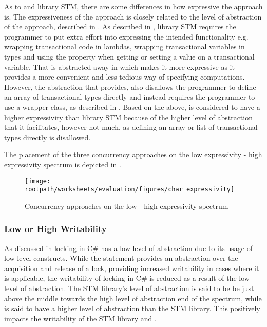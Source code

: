 As to \stmname and library \ac{STM}, there are some differences in how expressive the approach is. The expressiveness of the approach is closely related to the level of abstraction of the approach, described in . As described in , library \ac{STM} requires the programmer to put extra effort into expressing the intended functionality e.g. wrapping transactional code in lambdas, wrapping transactional variables in  types and using the  property when getting or setting a value on a transactional variable. That is abstracted away in \stmname which makes it more expressive as it provides a more convenient and less tedious way of specifying computations. However, the abstraction that \stmname provides, also disallows the programmer to define an array of transactional types directly and instead requires the programmer to use a wrapper class, as described in . Based on the above, \stmname is considered to have a higher expressivity than library \ac{STM} because of the higher level of abstraction that it facilitates, however not much, as defining an array or list of transactional types directly is disallowed.

The placement of the three concurrency approaches on the low expressivity - high expressivity spectrum is depicted in . 

\begin{figure}[htbp]
\centering
 \texttt{[image: \\rootpath/worksheets/evaluation/figures/char\_expressivity]} 
 \caption{Concurrency approaches on the low - high expressivity spectrum}
\label{fig:char_expressivity}
\end{figure}

\subsubsection{Low or High Writability}
As discussed in  locking in C\# has a low level of abstraction due to its usage of low level constructs. While the  statement provides an abstraction over the acquisition and release of a lock, providing increased writability in cases where it is applicable, the writability of locking in C\# is reduced as a result of the low level of abstraction. The \ac{STM} library's level of abstraction is said to be be just above the middle towards the high level of abstraction end of the spectrum, while \stmname is said to have a higher level of abstraction than the \ac{STM} library. This positively impacts the writability of the \ac{STM} library and \stmname.

